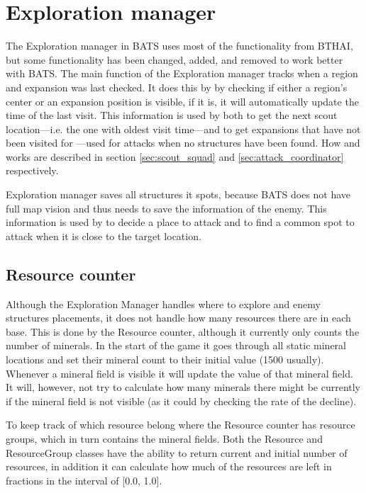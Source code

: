 \section{Exploration manager}
\label{sec:exploration_manager}
The Exploration manager in BATS uses most of the functionality from BTHAI, but some functionality
has been changed, added, and removed to work better with BATS. The main function of the Exploration
manager tracks when a region and expansion was last checked. It does this by by checking if either a
region’s center or an expansion position is visible, if it is, it will automatically update the time
of the last visit. This information is used by both  to get the next scout
location—i.e. the one with oldest visit time—and  to get expansions
that have not been visited for \attackCoordinatorExpansionNotCheckedTime—used for attacks when no
structures have been found. How  and  works
are described in section \ref{sec:scout_squad} and \ref{sec:attack_coordinator} respectively.

Exploration manager saves all structures it spots, because BATS does not have full map vision and
thus needs to save the information of the enemy. This information is used by
 to decide a place to attack and  to find
a common spot to attack when it is close to the target location.

\subsection{Resource counter}
\label{sec:resource_counter}
Although the Exploration Manager handles where to explore and enemy structures placements, it does
not handle how many resources there are in each base. This is done by the Resource counter, although
it currently only counts the number of minerals. In the start of the game it goes through all static
mineral locations and set their mineral count to their initial value (1500 usually). Whenever a
mineral field is visible it will update the value of that mineral field. It will, however, not try
to calculate how many minerals there might be currently if the mineral field is not visible (as it
could by checking the rate of the decline).

To keep track of which resource belong where the Resource counter has resource groups, which in turn
contains the mineral fields. Both the Resource and ResourceGroup classes have the ability to return
current and initial number of resources, in addition it can calculate how much of the resources are
left in fractions in the interval of [0.0, 1.0].
